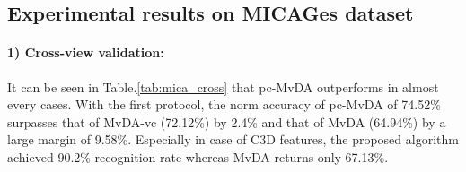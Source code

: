 
\subsection{Experimental results on MICAGes dataset}

    \paragraph{1) Cross-view validation:} It can be seen in Table.\ref{tab:mica_cross} that pc-MvDA outperforms in almost every cases. With the first protocol, the norm accuracy of pc-MvDA of 74.52\% surpasses that of MvDA-vc (72.12\%) by 2.4\% and that of MvDA (64.94\%) by a large margin of 9.58\%. Especially in case of C3D features, the proposed algorithm achieved 90.2\% recognition rate whereas MvDA returns only 67.13\%.

    \begin{table}[htbp]
    \centering
    \caption{Cross-view recognition comparison on MICAGes dataset}
    \label{tab:mica_cross}
    \end{table}

